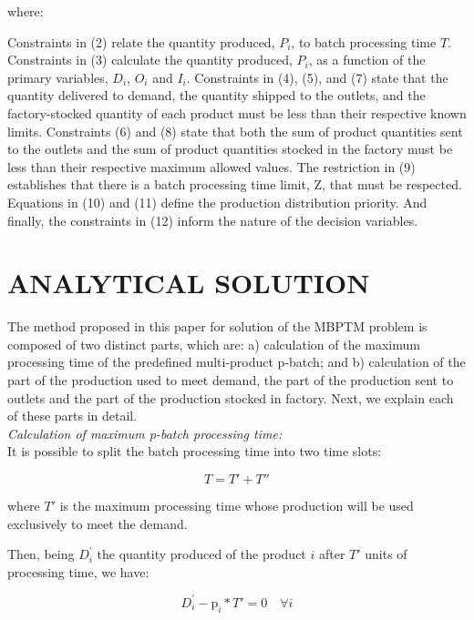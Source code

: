 \documentclass[10pt,fleqn,a4paper,twoside]{article}
\begin{document}
where:

Constraints in (2) relate the quantity produced, $P_i$, to batch processing time $T$. Constraints in (3) calculate the quantity produced, $P_i$, as a function of the primary variables, $D_i$, $O_i$ and $I_i$. Constraints in (4), (5), and (7) state that the quantity delivered to demand, the quantity shipped to the outlets, and the factory-stocked quantity of each product must be less than their respective known limits. Constraints (6) and (8) state that both the sum of product quantities sent to the outlets and the sum of product quantities stocked in the factory must be less than their respective maximum allowed values. The restriction in (9) establishes that there is a batch processing time limit, $\textrm{Z}$, that must be respected. Equations in (10) and (11) define the production distribution priority. And finally, the constraints in (12) inform the nature of the decision variables.

\section{ANALYTICAL SOLUTION}
\label{sec:analyticalSol}

The method proposed in this paper for solution of the MBPTM problem is composed of two distinct parts, which are: a) calculation of the maximum processing time of the predefined multi-product p-batch; and b) calculation of the part of the production used to meet demand, the part of the production sent to outlets and the part of the production stocked in factory. Next, we explain each of these parts in detail. \\

\noindent \emph{Calculation of maximum p-batch processing time:} \\

It is possible to split the batch processing time into two time slots:

\begin{equation}
T = T' + T''
\end{equation}

\noindent where $T'$ is the maximum processing time whose production will be used exclusively to meet the demand.

Then, being $D_{i}^{'}$ the quantity produced of the product $i$ after $T'$ units of processing time, we have:

\begin{equation}
\label{eq:s02}
D_{i}^{'} - \textrm{p}_i * T'  = 0 \quad \forall i
\end{equation}
\end{document}
